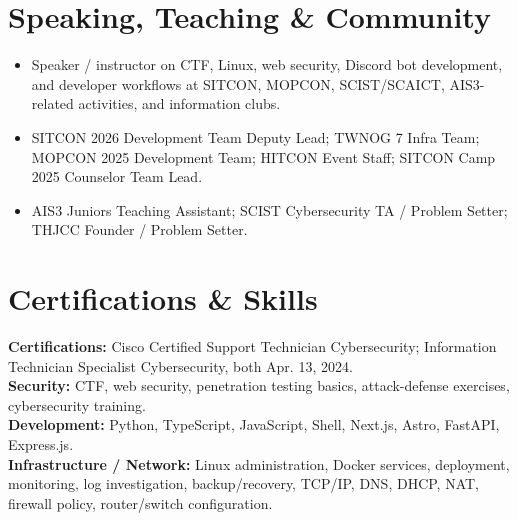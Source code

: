 \documentclass[10pt,a4paper]{article}
\begin{document}
\section*{Speaking, Teaching \& Community}
\begin{itemize}
  \item Speaker / instructor on CTF, Linux, web security, Discord bot development, and developer workflows at SITCON, MOPCON, SCIST/SCAICT, AIS3-related activities, and information clubs.
  \item SITCON 2026 Development Team Deputy Lead; TWNOG 7 Infra Team; MOPCON 2025 Development Team; HITCON Event Staff; SITCON Camp 2025 Counselor Team Lead.
  \item AIS3 Juniors Teaching Assistant; SCIST Cybersecurity TA / Problem Setter; THJCC Founder / Problem Setter.
\end{itemize}

\section*{Certifications \& Skills}
\textbf{Certifications:} Cisco Certified Support Technician Cybersecurity; Information Technician Specialist Cybersecurity, both Apr. 13, 2024.\\
\textbf{Security:} CTF, web security, penetration testing basics, attack-defense exercises, cybersecurity training.\\
\textbf{Development:} Python, TypeScript, JavaScript, Shell, Next.js, Astro, FastAPI, Express.js.\\
\textbf{Infrastructure / Network:} Linux administration, Docker services, deployment, monitoring, log investigation, backup/recovery, TCP/IP, DNS, DHCP, NAT, firewall policy, router/switch configuration.
\end{document}
